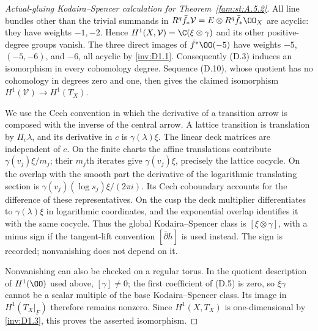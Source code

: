 \begin{proof}[Actual-gluing Kodaira--Spencer calculation for Theorem~\ref{fam:st:A.5.2}]
All line bundles other than the trivial summands in
$R^q\bar f_*\mathcal V=E\otimes R^q\bar f_*\OO_X$ are acyclic:
they have weights $-1,-2$. Hence $H^1(X,\mathcal V)=
\C(\xi\otimes\gamma)$ and its other positive-degree groups vanish.
The three direct images of $\bar f^*\OO(-5)$ have weights
$-5$, $(-5,-6)$, and $-6$, all acyclic by \ref{inv:D1.1}. Consequently (D.3)
induces an isomorphism in every cohomology degree. Sequence (D.10),
whose quotient has no cohomology in degrees zero and one, then gives
the claimed isomorphism $H^1(\mathcal V)\to H^1(T_X)$.

We use the Cech convention in which the derivative of a transition
arrow is composed with the inverse of the central arrow. A lattice
transition is translation by $\Pi_c\lambda$, and its derivative in
$c$ is $\gamma(\lambda)\xi$. The linear deck matrices are independent
of $c$. On the finite charts the affine translations contribute
$\gamma(v_j)\xi/m_j$; their $m_j$th iterates give
$\gamma(v_j)\xi$, precisely the lattice cocycle. On the overlap with
the smooth part the derivative of the logarithmic translating section
is $\gamma(v_j)(\log s_j)\xi/(2\pi i)$. Its Cech coboundary accounts
for the difference of these representatives. On the cusp the deck
multiplier differentiates to $\gamma(\lambda)\xi$ in logarithmic
coordinates, and the exponential overlap identifies it with the same
cocycle. Thus the global Kodaira--Spencer class is
$[\xi\otimes\gamma]$, with a minus sign if the tangent-lift convention
$[\bar\partial h]$ is used instead. The sign is recorded; nonvanishing
does not depend on it.

Nonvanishing can also be checked on a regular torus. In the quotient
description of $H^1(\OO)$ used above, $[\gamma]\ne0$; the first
coefficient of (D.5) is zero, so $\xi\gamma$ cannot be a scalar
multiple of the base Kodaira--Spencer class. Its image in
$H^1(T_X|_F)$ therefore remains nonzero. Since $H^1(X,T_X)$ is
one-dimensional by \ref{inv:D1.3}, this proves the asserted isomorphism.
\end{proof}

